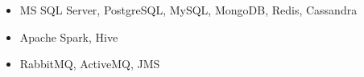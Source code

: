 {\begin{itemize}
    \item MS SQL Server, PostgreSQL, MySQL, MongoDB, Redis, Cassandra
    \item Apache Spark, Hive
    \item RabbitMQ, ActiveMQ, JMS
\end{itemize}}